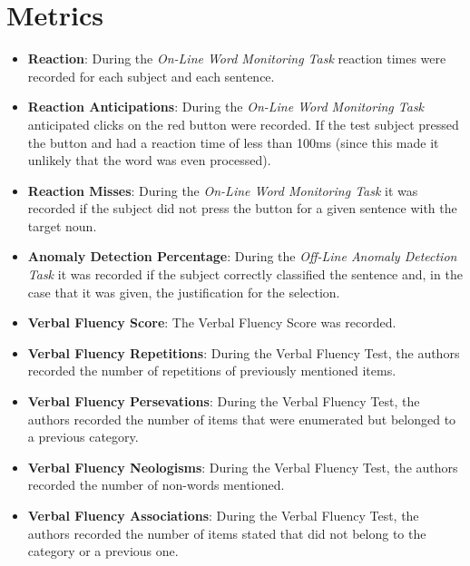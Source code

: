 \documentclass{Paper_Summary}
\begin{document}
\section{Metrics}
    \begin{itemize}
        \item \textbf{Reaction}: During the \emph{On-Line Word Monitoring Task} reaction times were recorded for each subject and each sentence.
        \item \textbf{Reaction Anticipations}: During the \emph{On-Line Word Monitoring Task} anticipated clicks on the red button were recorded. If the test subject pressed the button and had a reaction time of less than 100ms (since this made it unlikely that the word was even processed).
        \item \textbf{Reaction Misses}: During the \emph{On-Line Word Monitoring Task} it was recorded if the subject did not press the button for a given sentence with the target noun.
        \item \textbf{Anomaly Detection Percentage}: During the \emph{Off-Line Anomaly Detection Task} it was recorded if the subject correctly classified the sentence and, in the case that it was given, the justification for the selection.
        \item \textbf{Verbal Fluency Score}: The Verbal Fluency Score was recorded.
        \item \textbf{Verbal Fluency Repetitions}: During the Verbal Fluency Test, the authors recorded the number of repetitions of previously mentioned items.
        \item \textbf{Verbal Fluency Persevations}: During the Verbal Fluency Test, the authors recorded the number of items that were enumerated but belonged to a previous category.
        \item \textbf{Verbal Fluency Neologisms}: During the Verbal Fluency Test, the authors recorded the number of non-words mentioned.
        \item \textbf{Verbal Fluency Associations}: During the Verbal Fluency Test, the authors recorded the number of items stated that did not belong to the category or a previous one.
    \end{itemize}
\end{document}
